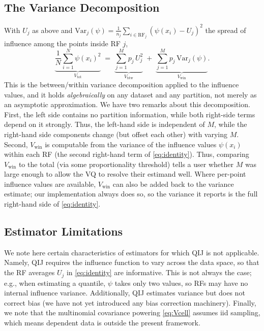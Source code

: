 \documentclass[runningheads]{llncs}
\newcommand{\ifl}{\psi}
\newcommand{\Vcell}{V_{\mathrm{btw}}}
\newcommand{\Vwithin}{V_{\mathrm{win}}}
\newcommand{\Vtotal}{V_{\mathrm{tot}}}
\begin{document}
\subsection{The Variance Decomposition}\label{sec:identity}

With $U_j$ as above and $\mathrm{Var}_j(\ifl) = \tfrac{1}{n_j}\sum_{i \in \mathrm{RF}_j}(\ifl(x_i) - U_j)^2$ the spread of influence among the points inside RF $j$,
\begin{equation}\label{eq:identity}
\underbrace{\frac1N\sum_{i=1}^{N} \ifl(x_i)^{2}}_{\Vtotal}
\;=\;
\underbrace{\sum_{j=1}^{M} p_j\, U_j^{2}}_{\Vcell}
\;+\;
\underbrace{\sum_{j=1}^{M} p_j\, \mathrm{Var}_j(\ifl)}_{\Vwithin}.
\end{equation}
This is the between/within variance decomposition applied to the influence values, and it holds \emph{algebraically} on any dataset and any partition, not merely as an asymptotic approximation. 
We have two remarks about this decomposition. First, the left side contains no partition information, while both right-side terms depend on it strongly. Thus, the left-hand side is independent of $M$, while the right-hand side components change (but offset each other) with varying $M$. Second, $\Vwithin$ is computable from the variance of the influence values $\ifl(x_i)$ within each RF (the second right-hand term of \eqref{eq:identity}). Thus, comparing $\Vwithin$ to the total (via some proportionality threshold) tells a user whether $M$ was large enough to allow the VQ to resolve their estimand well. Where per-point influence values are available, $\Vwithin$ can also be added back to the variance estimate; our implementation always does so, so the variance it reports is the full right-hand side of \eqref{eq:identity}.

\subsection{Estimator Limitations}\label{sec:scope}

We note here certain characteristics of estimators for which QIJ is not applicable. Namely, QIJ requires the influence function to vary across the data space, so that the RF averages $U_j$ in \eqref{eq:identity} are informative. This is not always the case; e.g., when estimating a quantile, $\ifl$ takes only two values, so RFs may have no internal influence variance. %
Additionally, QIJ estimates variance but does not correct bias (we have not yet introduced any bias correction machinery). Finally, we note that the multinomial covariance powering \eqref{eq:Vcell} assumes iid sampling, which means dependent data is outside the present framework.
\end{document}
